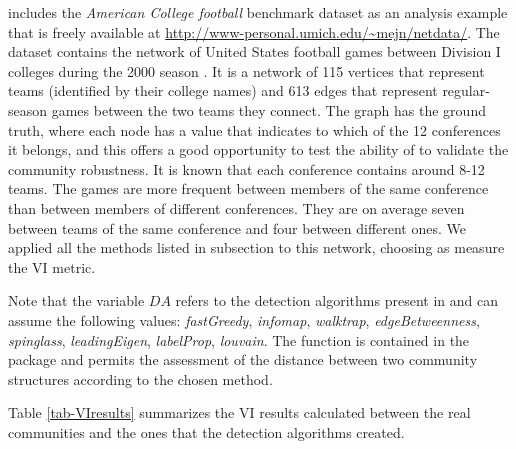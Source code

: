 includes the {\it American College football} benchmark dataset as an analysis example that is freely available at \url{http://www-personal.umich.edu/~mejn/netdata/}.
The dataset contains the network of United States football games between Division I colleges during the 2000 season \citep{GirvanNewman:2002}. 
It is a network of 115 vertices that represent teams (identified by their college names) and 613 edges that represent regular-season games between the two teams they connect. 
The graph has the ground truth, where each node has a value that indicates to which of the 12 conferences it belongs, and this offers a good opportunity to test the ability of  to validate the community robustness.
It is known that each conference contains around 8-12 teams. The games are more frequent between members of the same conference than between members of different conferences. They are on average seven between teams of the same conference and four between different ones.   
We applied all the methods listed in subsection \textbf{} to this network,  choosing as measure the VI metric. 




Note that the variable $DA$ refers to the detection algorithms present in  and can assume the following values: \textit{fastGreedy}, \textit{infomap}, \textit{walktrap}, \textit{edgeBetweenness}, \textit{spinglass}, \textit{leadingEigen}, \textit{labelProp}, \textit{louvain}. The function  is contained in the package  and permits the assessment of the distance between two community structures according to the chosen method.

Table \ref{tab-VIresults} summarizes the VI results calculated between the real communities and the ones that the detection algorithms created.

